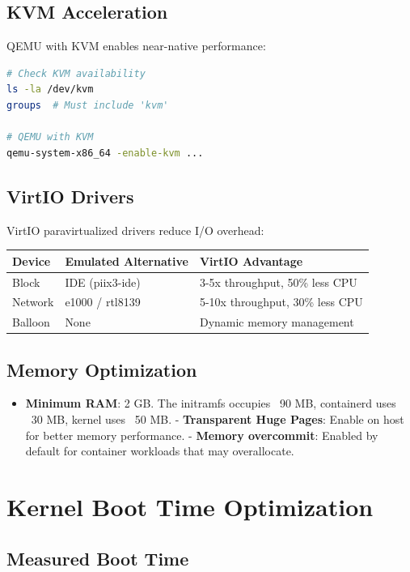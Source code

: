 \subsection{KVM Acceleration}

QEMU with KVM enables near-native performance:

\begin{lstlisting}[language=bash]
# Check KVM availability
ls -la /dev/kvm
groups  # Must include 'kvm'

# QEMU with KVM
qemu-system-x86_64 -enable-kvm ...
\end{lstlisting}

\subsection{VirtIO Drivers}

VirtIO paravirtualized drivers reduce I/O overhead:

\begin{longtable}{|p{3cm}|p{4cm}|p{5cm}|}
\hline
\textbf{Device} & \textbf{Emulated Alternative} & \textbf{VirtIO Advantage} \\
\hline
Block & IDE (piix3-ide) & 3-5x throughput, 50\% less CPU \\
Network & e1000 / rtl8139 & 5-10x throughput, 30\% less CPU \\
Balloon & None & Dynamic memory management \\
\hline
\end{longtable}

\subsection{Memory Optimization}

\begin{itemize}[nosep]
  \item \textbf{Minimum RAM}: 2 GB. The initramfs occupies ~90 MB,
        containerd uses ~30 MB, kernel uses ~50 MB.
  - \textbf{Transparent Huge Pages}: Enable on host for better memory
        performance.
  - \textbf{Memory overcommit}: Enabled by default for container workloads
        that may overallocate.
\end{itemize}

\section{Kernel Boot Time Optimization}

\subsection{Measured Boot Time}

